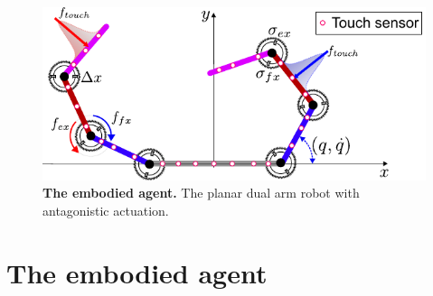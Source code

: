 \begin{figure}[!t]
	\begin{center}
		\hspace*{\fill}
		\includegraphics[width=0.99\columnwidth]{extended_dual_arm_robot.pdf}
		\hspace*{\fill}
	\end{center}
	\caption{\label{fig:extended_dual_arm_robot} \textbf{The embodied agent.} The planar dual arm robot with antagonistic actuation.}
\end{figure}
\section{The embodied agent}

